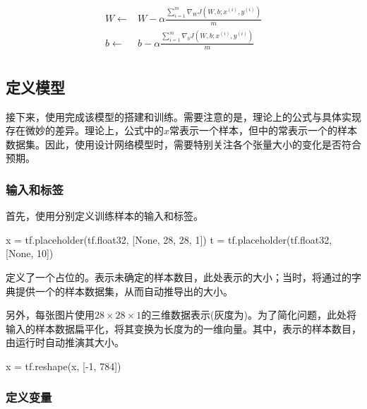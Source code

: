 \begin{content}
\[\begin{aligned}
  W \leftarrow  & W - \alpha \frac{{\sum\limits_{i = 1}^m {{\nabla _W}J\left( {W,b;{x^{(i)}},{y^{(i)}}} \right)} }}{m} \\ 
  b \leftarrow  & b - \alpha \frac{{\sum\limits_{i = 1}^m {{\nabla _b}J\left( {W,b;{x^{(i)}},{y^{(i)}}} \right)} }}{m} \\ 
\end{aligned} \]

\subsection{定义模型}

接下来，使用\tf{}完成该模型的搭建和训练。需要注意的是，理论上的公式与\tf{}具体实现存在微妙的差异。理论上，公式中的$x$常表示一个样本，但\tf{}中的常表示一个的样本数据集。因此，使用\tf{}设计网络模型时，需要特别关注各个张量大小的变化是否符合预期。

\subsubsection{输入和标签}

首先，使用分别定义训练样本的输入和标签。

\begin{leftbar}
\begin{python}
x = tf.placeholder(tf.float32, [None, 28, 28, 1])
t = tf.placeholder(tf.float32, [None, 10])
\end{python}
\end{leftbar}

定义了一个占位的。表示未确定的样本数目，此处表示的大小；当时，将通过的字典提供一个的样本数据集，从而自动推导出的大小。

另外，每张图片使用$ 28 \times 28 \times 1 $的三维数据表示(灰度为)。为了简化问题，此处将输入的样本数据扁平化，将其变换为长度为的一维向量。其中，表示的样本数目，由运行时自动推演其大小。

\begin{leftbar}
\begin{python}
x = tf.reshape(x, [-1, 784])
\end{python}
\end{leftbar}

\subsubsection{定义变量}


\end{content}
